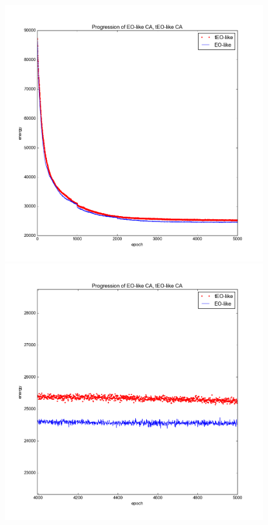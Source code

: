 \documentclass[12pt]{article}
\begin{document}
\begin{figure}
  \includegraphics{eo_rbm_unzoomed}
  \includegraphics{eo_rbm_zoomed}
\end{figure}
\end{document}
